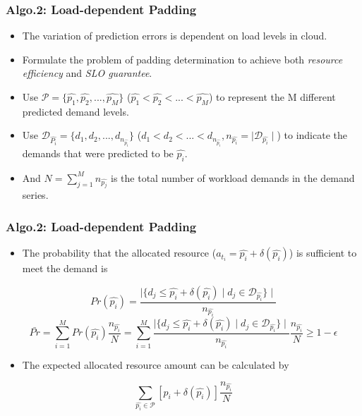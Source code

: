 \documentclass{beamer}
\begin{document}
	\begin{frame}
	\frametitle{Algo.2: Load-dependent Padding}
		\begin{itemize}
		\item The variation of prediction errors is dependent on load levels in cloud.
		\item Formulate the problem of padding determination to achieve both {\it resource efficiency} and {\it SLO guarantee}.
		\item Use $\mathscr{P}=\{\hat{p_{1}}, \hat{p_{2}}, ..., \hat{p_{M}}\}$ ($\hat{p_{1}} < \hat{p_{2}} < ... < \hat{p_{M}}$) to represent the M different predicted demand levels.
		\item Use $\mathscr{D}_{\hat{P_{i}}}=\{d_{1}, d_{2}, ..., d_{n_{\hat{p_{i}}}}\}$ ($d_{1} < d_{2} < ... < d_{n_{\hat{p_{i}}}},n_{\hat{p_{i}}}=\mid{\mathscr{D}_{\hat{p_{i}}}}\mid$) to indicate the demands that were predicted to be $\hat{p_{i}}$.
		\item And $N = \sum_{j=1}^{M} n_{\hat{p_{j}}}$ is the total number of workload demands in the demand series.
		\end{itemize}
	\end{frame}

	\begin{frame}
	\frametitle{Algo.2: Load-dependent Padding}
		\begin{itemize}
		\item The probability that the allocated resource ($a_{t_{i}}=\hat{p_{i}}+\delta(\hat{p_{i}})$) is sufficient to meet the demand is
		\end{itemize}
		\begin{equation} Pr(\hat{p_{i}})=\frac{\mid \{ d_{j}\leq\hat{p_{i}}+\delta(\hat{p_{i}}) \mid d_{j}\in \mathscr{D}_{\hat{p_{i}}} \} \mid}{n_{\hat{p_{i}}}} \end{equation}
		\begin{equation} \bar{Pr}=\sum^{M}_{i=1}Pr(\hat{p_{i}})\frac{n_{\hat{p_{i}}}}{N}=\sum^{M}_{i=1}\frac{\mid \{ d_{j}\leq\hat{p_{i}}+\delta(\hat{p_{i}}) \mid d_{j}\in \mathscr{D}_{\hat{p_{i}}} \} \mid}{n_{\hat{p_{i}}}} \frac{n_{\hat{p_{i}}}}{N} \geq 1-\epsilon \end{equation}
		\begin{itemize}
		\item The expected allocated resource amount can be calculated by
		\end{itemize}
		\begin{equation} \sum_{\hat{p_{i}}\in\mathscr{P}}[\hat{p_{i}}+\delta(\hat{p_{i}})]\frac{n_{\hat{p_{i}}}}{N} \end{equation}
	\end{frame}
\end{document}
